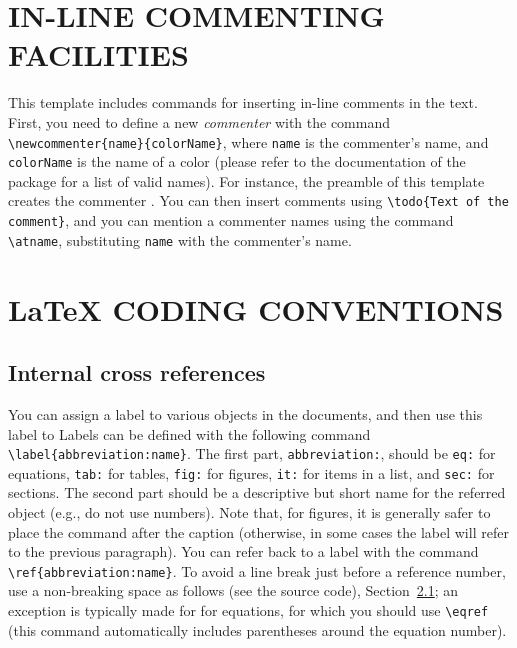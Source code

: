 \documentclass[letterpaper, 10 pt, conference]{ieeeconf}
\begin{document}
 \addtolength{\textheight}{-7.2cm}   %

\section{IN-LINE COMMENTING FACILITIES}
This template includes commands for inserting in-line comments in the text. First, you need to define a new \emph{commenter} with the command \verb|\newcommenter{name}{colorName}|, where \verb|name| is the commenter's name, and \verb|colorName| is the name of a color (please refer to the documentation of the  package for a list of valid names). For instance, the preamble of this template creates the commenter . You can then insert comments using \verb|\todo{Text of the comment}|, and you can mention a commenter names using the command \verb|\atname|, substituting \verb|name| with the commenter's name. 

\section{\LaTeX{} CODING CONVENTIONS}
\subsection{Internal cross references}
\label{sec:internal-xrefs}
You can assign a label to various objects in the documents, and then use this label to 
Labels can be defined with the following command \verb|\label{abbreviation:name}|. The first part, \verb|abbreviation:|, should be \verb|eq:| for equations, \verb|tab:| for tables, \verb|fig:| for figures, \verb|it:| for items in a list, and \verb|sec:| for sections. The second part should be a descriptive but short name for the referred object (e.g., do not use numbers). Note that, for figures, it is generally safer to place the  command after the caption (otherwise, in some cases the label will refer to the previous paragraph).
You can refer back to a label with the command \verb|\ref{abbreviation:name}|. To avoid a line break just before a reference number, use a non-breaking space as follows (see the source code), Section~\ref{sec:internal-xrefs}; an exception is typically made for for equations, for which you should use \verb|\eqref| (this command automatically includes parentheses around the equation number).
\end{document}
